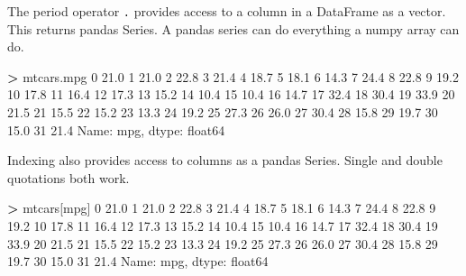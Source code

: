 \documentclass[
]{book}
\newenvironment{Shaded}{\begin{snugshade}}{\end{snugshade}}
\newcommand{\DecValTok}[1]{\textcolor[rgb]{0.00,0.00,0.81}{#1}}
\newcommand{\FloatTok}[1]{\textcolor[rgb]{0.00,0.00,0.81}{#1}}
\newcommand{\NormalTok}[1]{#1}
\newcommand{\OperatorTok}[1]{\textcolor[rgb]{0.81,0.36,0.00}{\textbf{#1}}}
\newcommand{\StringTok}[1]{\textcolor[rgb]{0.31,0.60,0.02}{#1}}
\begin{document}
The period operator \texttt{.} provides access to a column in a DataFrame as a vector. This returns pandas Series. A pandas series can do everything a numpy array can do.

\begin{Shaded}
\begin{Highlighting}[]
\OperatorTok{\textgreater{}}\NormalTok{ mtcars.mpg}
\DecValTok{0}     \FloatTok{21.0}
\DecValTok{1}     \FloatTok{21.0}
\DecValTok{2}     \FloatTok{22.8}
\DecValTok{3}     \FloatTok{21.4}
\DecValTok{4}     \FloatTok{18.7}
\DecValTok{5}     \FloatTok{18.1}
\DecValTok{6}     \FloatTok{14.3}
\DecValTok{7}     \FloatTok{24.4}
\DecValTok{8}     \FloatTok{22.8}
\DecValTok{9}     \FloatTok{19.2}
\DecValTok{10}    \FloatTok{17.8}
\DecValTok{11}    \FloatTok{16.4}
\DecValTok{12}    \FloatTok{17.3}
\DecValTok{13}    \FloatTok{15.2}
\DecValTok{14}    \FloatTok{10.4}
\DecValTok{15}    \FloatTok{10.4}
\DecValTok{16}    \FloatTok{14.7}
\DecValTok{17}    \FloatTok{32.4}
\DecValTok{18}    \FloatTok{30.4}
\DecValTok{19}    \FloatTok{33.9}
\DecValTok{20}    \FloatTok{21.5}
\DecValTok{21}    \FloatTok{15.5}
\DecValTok{22}    \FloatTok{15.2}
\DecValTok{23}    \FloatTok{13.3}
\DecValTok{24}    \FloatTok{19.2}
\DecValTok{25}    \FloatTok{27.3}
\DecValTok{26}    \FloatTok{26.0}
\DecValTok{27}    \FloatTok{30.4}
\DecValTok{28}    \FloatTok{15.8}
\DecValTok{29}    \FloatTok{19.7}
\DecValTok{30}    \FloatTok{15.0}
\DecValTok{31}    \FloatTok{21.4}
\NormalTok{Name: mpg, dtype: float64}
\end{Highlighting}
\end{Shaded}

Indexing also provides access to columns as a pandas Series. Single and double quotations both work.

\begin{Shaded}
\begin{Highlighting}[]
\OperatorTok{\textgreater{}}\NormalTok{ mtcars[}\StringTok{\textquotesingle{}mpg\textquotesingle{}}\NormalTok{]}
\DecValTok{0}     \FloatTok{21.0}
\DecValTok{1}     \FloatTok{21.0}
\DecValTok{2}     \FloatTok{22.8}
\DecValTok{3}     \FloatTok{21.4}
\DecValTok{4}     \FloatTok{18.7}
\DecValTok{5}     \FloatTok{18.1}
\DecValTok{6}     \FloatTok{14.3}
\DecValTok{7}     \FloatTok{24.4}
\DecValTok{8}     \FloatTok{22.8}
\DecValTok{9}     \FloatTok{19.2}
\DecValTok{10}    \FloatTok{17.8}
\DecValTok{11}    \FloatTok{16.4}
\DecValTok{12}    \FloatTok{17.3}
\DecValTok{13}    \FloatTok{15.2}
\DecValTok{14}    \FloatTok{10.4}
\DecValTok{15}    \FloatTok{10.4}
\DecValTok{16}    \FloatTok{14.7}
\DecValTok{17}    \FloatTok{32.4}
\DecValTok{18}    \FloatTok{30.4}
\DecValTok{19}    \FloatTok{33.9}
\DecValTok{20}    \FloatTok{21.5}
\DecValTok{21}    \FloatTok{15.5}
\DecValTok{22}    \FloatTok{15.2}
\DecValTok{23}    \FloatTok{13.3}
\DecValTok{24}    \FloatTok{19.2}
\DecValTok{25}    \FloatTok{27.3}
\DecValTok{26}    \FloatTok{26.0}
\DecValTok{27}    \FloatTok{30.4}
\DecValTok{28}    \FloatTok{15.8}
\DecValTok{29}    \FloatTok{19.7}
\DecValTok{30}    \FloatTok{15.0}
\DecValTok{31}    \FloatTok{21.4}
\NormalTok{Name: mpg, dtype: float64}
\end{Highlighting}
\end{Shaded}
\end{document}
